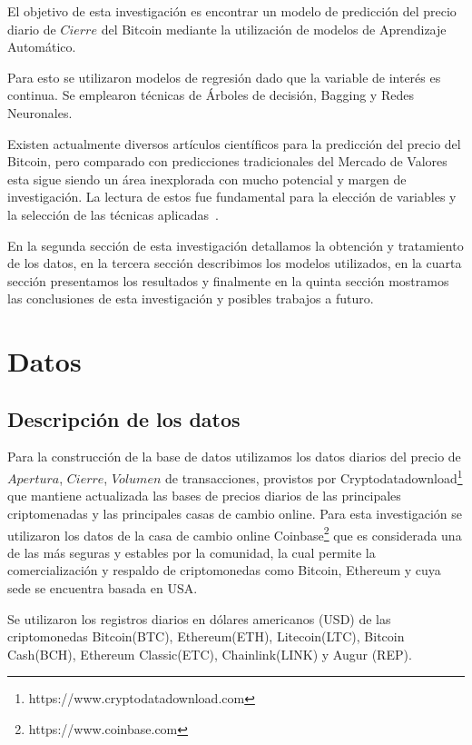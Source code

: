 \documentclass[a4paper,12pt,twocolumn]{article}
\begin{document}
El objetivo de esta investigación es encontrar un modelo de predicción del precio diario de $Cierre$ del Bitcoin mediante la utilización de modelos de Aprendizaje Automático. 

Para esto se utilizaron modelos de regresión dado que la variable de interés es continua. Se emplearon técnicas de Árboles de decisión, Bagging y Redes Neuronales. 

Existen actualmente diversos artículos científicos para la predicción del precio del Bitcoin, pero comparado con predicciones tradicionales del Mercado de Valores esta sigue siendo un área inexplorada con mucho potencial y margen de investigación. La lectura de estos fue fundamental para la elección de variables y la selección de las técnicas aplicadas~\cite{mainDriversBitcoin}.

En la segunda sección de esta investigación detallamos la obtención y tratamiento de los datos, en la tercera sección describimos los modelos utilizados, en la cuarta sección presentamos los resultados y finalmente en la quinta sección mostramos las conclusiones de esta investigación y posibles trabajos a futuro.



\section{Datos}
\subsection{Descripción de los datos}

Para la construcción de la base de datos utilizamos los datos diarios del precio de $Apertura$, $Cierre$, $Volumen$ de transacciones, provistos por Cryptodatadownload\footnote{https://www.cryptodatadownload.com}  que mantiene actualizada las bases de precios diarios de las principales criptomenadas y las principales casas de cambio online. Para esta investigación se utilizaron los datos de la casa de cambio online Coinbase\footnote{https://www.coinbase.com} que es considerada una de las más seguras y estables por la comunidad, la cual permite la comercialización y respaldo de criptomonedas como Bitcoin, Ethereum y cuya sede se encuentra basada en USA. 

Se utilizaron los registros diarios en dólares americanos (USD)  de las criptomonedas Bitcoin(BTC), Ethereum(ETH), Litecoin(LTC), Bitcoin Cash(BCH), Ethereum Classic(ETC), Chainlink(LINK) y  Augur (REP). 
\end{document}
